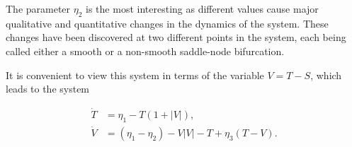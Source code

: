 The parameter $\eta_2$ is the most interesting as different values cause major qualitative and quantitative changes in the dynamics of the system. These changes have been discovered at two different points in the system, each being called either a smooth or a non-smooth saddle-node bifurcation.

It is convenient to view this system in terms of the variable $V=T-S$, which leads to the system

\begin{equation}\label{eq:basic_stommel}
  \begin{aligned}
   \dot{T} & =  \eta_1-T(1+|V|), \\
   \dot{V}     & =  (\eta_1-\eta_2)-V|V|-T+\eta_3(T-V).
  \end{aligned}
\end{equation}


